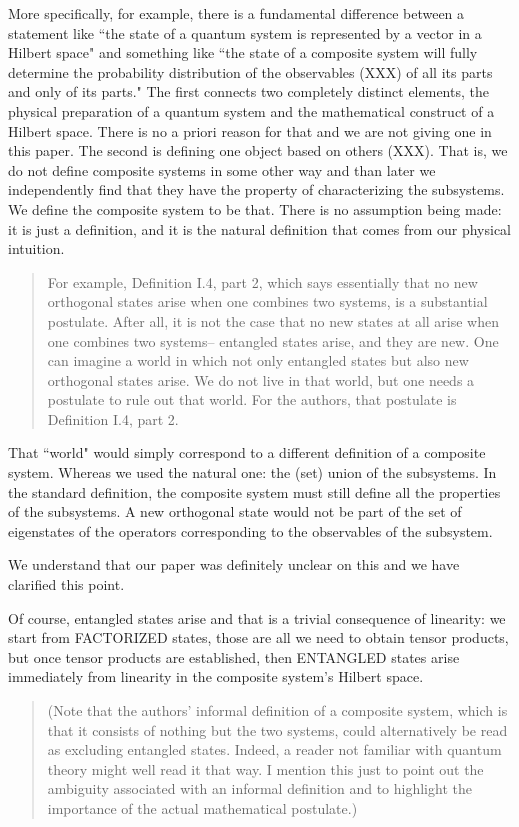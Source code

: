 \documentclass[11pt]{article}
\begin{document}
More specifically, for example, there is a fundamental difference between a statement
like ``the state of a quantum system is represented by a vector in a
Hilbert space" and something like ``the state of a composite system
will fully determine the probability distribution of the observables (XXX) of
all its parts and only of its parts." The first connects two
completely distinct elements, the physical preparation of a quantum
system and the mathematical construct of a Hilbert space. There is no
a priori reason for that and we are not giving one in this paper. The
second is defining one object based on others (XXX). That is, we do not
define composite systems in some other way and than later we
independently find that they have the property of characterizing the
subsystems.  We define the composite system to be that. There is no
assumption being made: it is just a definition, and it is the natural
definition that comes from our physical intuition.

\begin{quote} For
example, Definition I.4, part 2, which says essentially that no new
orthogonal states arise when one combines two systems, is a
substantial postulate. After all, it is not the case that no new
states at all arise when one combines two systems-- entangled states
arise, and they are new. One can imagine a world in which not only
entangled states but also new orthogonal states arise. We do not live
in that world, but one needs a postulate to rule out that world. For
the authors, that postulate is Definition I.4, part 2.
\end{quote}

That ``world" would simply correspond to a different definition of a composite system. Whereas we used the natural one: the (set) union of the subsystems. 
In the standard definition, the
composite system must still define all the properties of the subsystems. A new orthogonal state would not be part of the set of eigenstates of the
operators corresponding to the observables of the subsystem.

We understand that our paper was definitely unclear on this and we have
clarified this point. 

Of course, entangled states arise and that is a
trivial consequence of linearity: we start from FACTORIZED states,
those are all we need to obtain tensor products, but once tensor
products are established, then ENTANGLED states arise immediately from
linearity in the composite system's Hilbert space.

\begin{quote}
(Note that the authors' informal definition of a composite
system, which is that it consists of nothing but the two systems,
could alternatively be read as excluding entangled states. Indeed, a
reader not familiar with quantum theory might well read it that way. I
mention this just to point out the ambiguity associated with an
informal definition and to highlight the importance of the actual
mathematical postulate.)
\end{quote}
\end{document}
